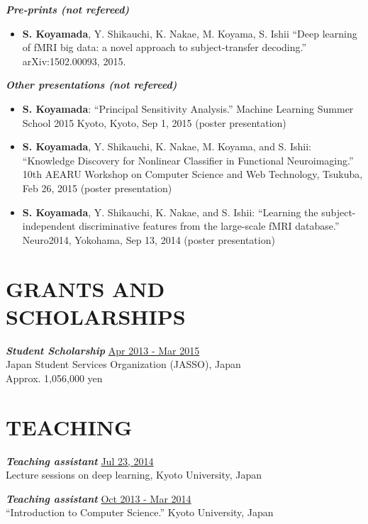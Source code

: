 \documentclass[margin, 10pt]{res} %
\begin{document}
\begin{resume}
{\sl {\bf Pre-prints (not refereed)}} \vspace{0.5em}
\begin{itemize}
\item {\bf S. Koyamada}, Y. Shikauchi, K. Nakae, M. Koyama, S. Ishii ``Deep learning of fMRI big data: a novel approach to subject-transfer decoding.'' arXiv:1502.00093, 2015.
\end{itemize}

{\sl {\bf Other presentations (not refereed)}} \vspace{0.5em}
\begin{itemize}
\item {\bf S. Koyamada}: ``Principal Sensitivity Analysis.'' Machine Learning Summer School 2015 Kyoto, Kyoto, Sep 1, 2015 (poster presentation)
\item {\bf S. Koyamada}, Y. Shikauchi, K. Nakae, M. Koyama, and S. Ishii: ``Knowledge Discovery for Nonlinear Classifier in Functional Neuroimaging.'' 10th AEARU Workshop on Computer Science and Web Technology, Tsukuba, Feb 26, 2015 (poster presentation)
\item {\bf S. Koyamada}, Y. Shikauchi, K. Nakae, and S. Ishii: ``Learning the subject-independent discriminative features from the large-scale fMRI database.'' Neuro2014, Yokohama, Sep 13, 2014 (poster presentation)
\end{itemize}

\section{{\small GRANTS AND\\SCHOLARSHIPS}}
{\sl {\bf Student Scholarship}} \hfill {\small \underline{Apr 2013 - Mar 2015}} \\
Japan Student Services Organization (JASSO), Japan \\
Approx. 1,056,000 yen

\section{{\small TEACHING}}
{\sl {\bf Teaching assistant}} \hfill {\small \underline{Jul 23, 2014}} \\
Lecture sessions on deep learning, Kyoto University, Japan

{\sl {\bf Teaching assistant}} \hfill {\small \underline{Oct 2013 - Mar 2014}} \\
``Introduction to Computer Science.'' Kyoto University, Japan


\end{resume}
\end{document}
